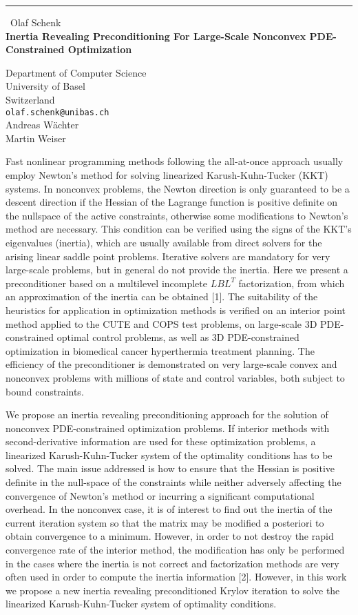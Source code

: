 \documentclass{report}
\begin{document}
\begin{center}
\rule{6in}{1pt} \
{\large Olaf Schenk \\
{\bf Inertia Revealing Preconditioning For Large-Scale Nonconvex PDE-Constrained Optimization }}

Department of Computer Science \\ University of Basel \\ Switzerland
\\
{\tt olaf.schenk@unibas.ch}\\
Andreas W\"achter\\
Martin Weiser\end{center}

Fast nonlinear programming methods following the all-at-once approach
usually employ Newton's method for solving linearized Karush-Kuhn-Tucker
(KKT) systems. In nonconvex problems, the Newton direction is only
guaranteed to be a descent direction if the Hessian of the Lagrange function
is positive definite on the nullspace of the active constraints, otherwise
some modifications to Newton's method are necessary. This condition can be
verified using the signs of the KKT's eigenvalues (inertia), which are
usually available from direct solvers for the arising linear saddle point
problems. Iterative solvers are mandatory for very large-scale problems,
but in general do not provide the inertia. Here we present a preconditioner
based on a multilevel incomplete $LBL^T$ factorization, from which an
approximation of the inertia can be obtained [1]. The suitability of the
heuristics for application in optimization methods is verified on an
interior point method applied to the CUTE and COPS test problems, on
large-scale 3D PDE-constrained optimal control problems, as well as 3D
PDE-constrained optimization in biomedical cancer hyperthermia treatment
planning. The efficiency of the preconditioner is demonstrated on very
large-scale convex and nonconvex problems with millions of state and control
variables, both subject to bound constraints.

We propose an inertia revealing preconditioning approach for the solution of
nonconvex PDE-constrained optimization problems. If interior methods with
second-derivative information are used for these optimization problems, a
linearized Karush-Kuhn-Tucker system of the optimality conditions has to be
solved. The main issue addressed is how to ensure that the Hessian is
positive definite in the null-space of the constraints while neither
adversely affecting the convergence of Newton's method or incurring a
significant computational overhead. In the nonconvex case, it is of
interest to find out the inertia of the current iteration system so that the
matrix may be modified a posteriori to obtain convergence to a minimum.
However, in order to not destroy the rapid convergence rate of the interior
method, the modification has only be performed in the cases where the
inertia is not correct and factorization methods are very often used in
order to compute the inertia information [2]. However, in this work we
propose a new inertia revealing preconditioned Krylov iteration to solve the
linearized Karush-Kuhn-Tucker system of optimality conditions.
\end{document}

